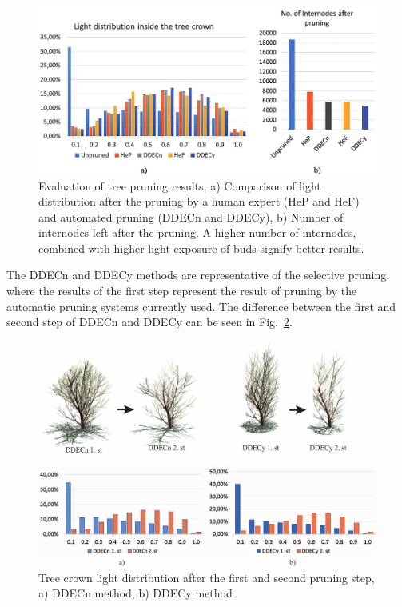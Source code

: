 \begin{figure}[hbt]
    \centering
    \includegraphics[width=5in]{figs/image5.jpeg}
    \caption{Evaluation of tree pruning results, a) Comparison of
light distribution after the pruning by a human expert (HeP and HeF) and
automated pruning (DDECn and DDECy), b) Number of internodes left after
the pruning. A higher number of internodes, combined with higher light
exposure of buds signify better results.}
\label{fig:my_figure5}
\end{figure}

The DDECn and DDECy methods are representative of the selective pruning, where the
results of the first step represent the result of pruning by the
automatic pruning systems currently used. The difference between the
first and second step of DDECn and DDECy can be seen in Fig.~\ref{fig:my_figure6}.

\begin{figure}[hbt]
    \centering
    \includegraphics[width=5.4in]{figs/image6.jpeg}
    \caption{Tree crown light distribution after the first and
second pruning step, a) DDECn method, b) DDECy method}
    \label{fig:my_figure6}
\end{figure}

